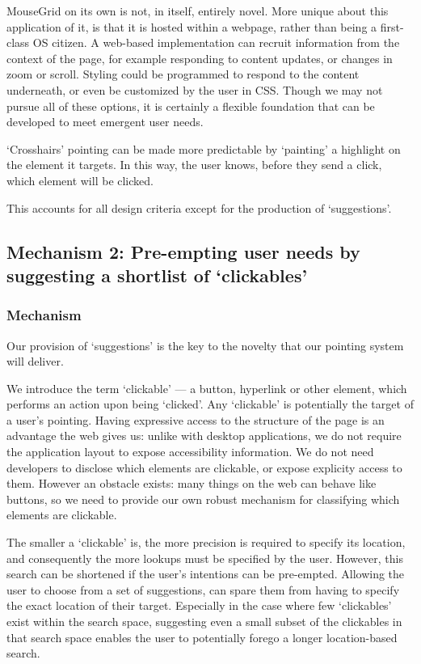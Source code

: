 \documentclass[11pt,openright,a4paper]{report}
\begin{document}
MouseGrid on its own is not, in itself, entirely novel. More unique about this application of it, is that it is hosted within a webpage, rather than being a first-class OS citizen. A web-based implementation can recruit information from the context of the page, for example responding to content updates, or changes in zoom or scroll. Styling could be programmed to respond to the content underneath, or even be customized by the user in CSS. Though we may not pursue all of these options, it is certainly a flexible foundation that can be developed to meet emergent user needs.

`Crosshairs' pointing can be made more predictable by `painting' a highlight on the element it targets. In this way, the user knows, before they send a click, which element will be clicked.

This accounts for all design criteria except for the production of `suggestions'.
\subsection{Mechanism 2: Pre-empting user needs by suggesting a shortlist of `clickables'}
\subsubsection{Mechanism}
Our provision of `suggestions' is the key to the novelty that our pointing system will deliver.

\label{sec:clickablesExplained}
We introduce the term `clickable' --- a button, hyperlink or other element, which performs an action upon being `clicked'. Any `clickable' is potentially the target of a user's pointing. Having expressive access to the structure of the page is an advantage the web gives us: unlike with desktop applications, we do not require the application layout to expose accessibility information. We do not need developers to disclose which elements are clickable, or expose explicity access to them. However an obstacle exists: many things on the web can behave like buttons, so we need to provide our own robust mechanism for classifying which elements are clickable.

The smaller a `clickable' is, the more precision is required to specify its location, and consequently the more lookups must be specified by the user. However, this search can be shortened if the user's intentions can be pre-empted. Allowing the user to choose from a set of suggestions, can spare them from having to specify the exact location of their target. Especially in the case where few `clickables' exist within the search space, suggesting even a small subset of the clickables in that search space enables the user to potentially forego a longer location-based search.
\end{document}
